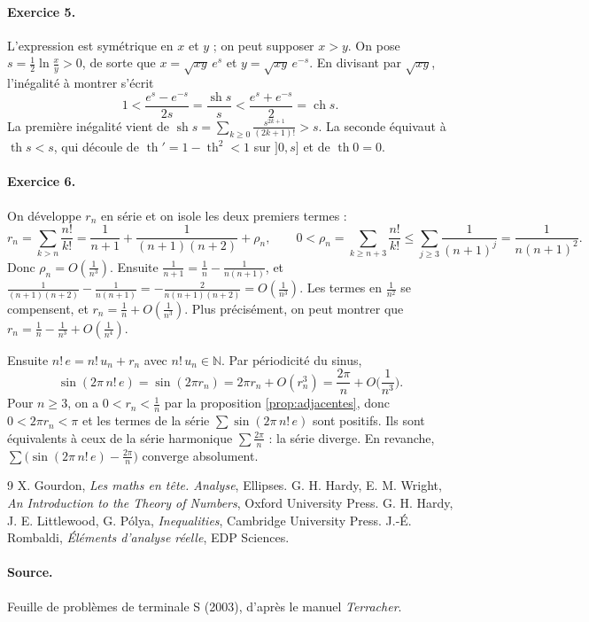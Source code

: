 \documentclass[11pt,a4paper]{article}
\theoremstyle{plain}
\theoremstyle{definition}
\theoremstyle{remark}
\newcommand{\N}{\mathbb{N}}
\begin{document}
\paragraph{Exercice 5.} L'expression est symétrique en $x$ et $y$ ; on peut supposer $x>y$. On pose $s=\frac12\ln\frac xy>0$, de sorte que $x=\sqrt{xy}\,e^s$ et $y=\sqrt{xy}\,e^{-s}$. En divisant par $\sqrt{xy}$, l'inégalité à montrer s'écrit
\[
  1<\frac{e^{s}-e^{-s}}{2s}=\frac{\operatorname{sh}s}s<\frac{e^{s}+e^{-s}}2=\operatorname{ch}s .
\]
La première inégalité vient de $\operatorname{sh}s=\sum_{k\geq0}\frac{s^{2k+1}}{(2k+1)!}>s$. La seconde équivaut à $\operatorname{th}s<s$, qui découle de $\operatorname{th}'=1-\operatorname{th}^2<1$ sur $]0,s]$ et de $\operatorname{th}0=0$.

\paragraph{Exercice 6.} On développe $r_n$ en série et on isole les deux premiers termes :
\[
  r_n=\sum_{k>n}\frac{n!}{k!}=\frac1{n+1}+\frac1{(n+1)(n+2)}+\rho_n,
  \qquad
  0<\rho_n=\sum_{k\geq n+3}\frac{n!}{k!}\leq\sum_{j\geq3}\frac1{(n+1)^j}=\frac1{n(n+1)^2}.
\]
Donc $\rho_n=O(\frac1{n^3})$. Ensuite $\frac1{n+1}=\frac1n-\frac1{n(n+1)}$, et $\frac1{(n+1)(n+2)}-\frac1{n(n+1)}=-\frac2{n(n+1)(n+2)}=O(\frac1{n^3})$. Les termes en $\frac1{n^2}$ se compensent, et $r_n=\frac1n+O(\frac1{n^3})$. Plus précisément, on peut montrer que $r_n=\frac1n-\frac1{n^3}+O(\frac1{n^4})$.

Ensuite $n!\,e=n!\,u_n+r_n$ avec $n!\,u_n\in\N$. Par périodicité du sinus,
\[
  \sin(2\pi\,n!\,e)=\sin(2\pi r_n)=2\pi r_n+O(r_n^3)=\frac{2\pi}n+O\Big(\frac1{n^3}\Big).
\]
Pour $n\geq3$, on a $0<r_n<\frac1n$ par la proposition \ref{prop:adjacentes}, donc $0<2\pi r_n<\pi$ et les termes de la série $\sum\sin(2\pi\,n!\,e)$ sont positifs. Ils sont équivalents à ceux de la série harmonique $\sum\frac{2\pi}n$ : la série diverge. En revanche, $\sum\big(\sin(2\pi\,n!\,e)-\frac{2\pi}n\big)$ converge absolument.

\begin{thebibliography}{9}
 X. Gourdon, \emph{Les maths en tête. Analyse}, Ellipses.
 G. H. Hardy, E. M. Wright, \emph{An Introduction to the Theory of Numbers}, Oxford University Press.
 G. H. Hardy, J. E. Littlewood, G. Pólya, \emph{Inequalities}, Cambridge University Press.
 J.-É. Rombaldi, \emph{Éléments d'analyse réelle}, EDP Sciences.
\end{thebibliography}

\paragraph{Source.} Feuille de problèmes de terminale S (2003), d'après le manuel \emph{Terracher}.
\end{document}
